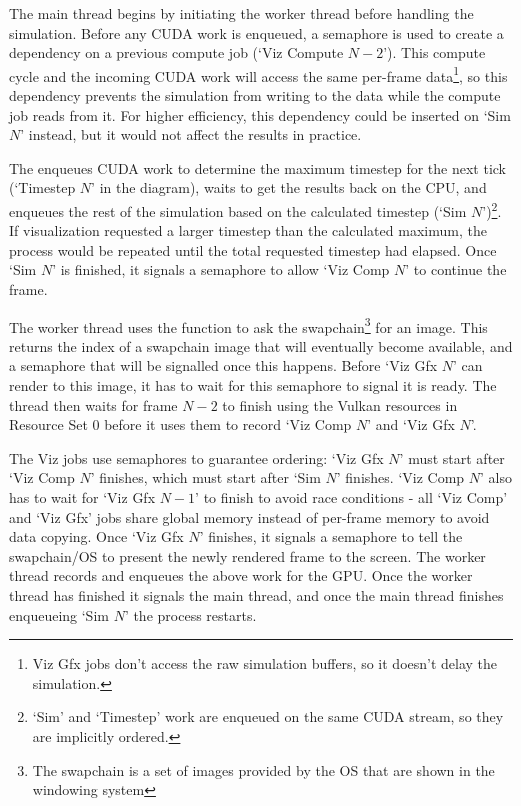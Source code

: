 The main thread begins by initiating the worker thread before handling the simulation.
Before any CUDA work is enqueued, a semaphore is used to create a dependency on a previous compute job (`Viz Compute $N - 2$'). %
This compute cycle and the incoming CUDA work will access the same per-frame data\footnote{Viz Gfx jobs don't access the raw simulation buffers, so it doesn't delay the simulation.}, so this dependency prevents the simulation from writing to the data while the compute job reads from it.
For higher efficiency, this dependency could be inserted on `Sim $N$' instead, but it would not affect the results in practice.

The  enqueues CUDA work to determine the maximum timestep for the next tick (`Timestep $N$' in the diagram), waits to get the results back on the CPU, and enqueues the rest of the simulation based on the calculated timestep (`Sim $N$')\footnote{`Sim' and `Timestep' work are enqueued on the same CUDA stream, so they are implicitly ordered.}.
If visualization requested a larger timestep than the calculated maximum, the process would be repeated until the total requested timestep had elapsed.
Once `Sim $N$' is finished, it signals a semaphore to allow `Viz Comp $N$' to continue the frame. %

The worker thread uses the  function to ask the swapchain\footnote{The swapchain is a set of images provided by the OS that are shown in the windowing system} for an image.
This returns the index of a swapchain image that will eventually become available, and a semaphore that will be signalled once this happens.
Before `Viz Gfx $N$' can render to this image, it has to wait for this semaphore to signal it is ready. %
The thread then waits for frame $N-2$ to finish using the Vulkan resources in Resource Set 0 before it uses them to record `Viz Comp $N$' and `Viz Gfx $N$'. %

The Viz jobs use semaphores to guarantee ordering:
`Viz Gfx $N$' must start after `Viz Comp $N$' finishes, which must start after `Sim $N$' finishes. %
`Viz Comp $N$' also has to wait for `Viz Gfx $N - 1$' to finish to avoid race conditions - all `Viz Comp' and `Viz Gfx' jobs share global memory instead of per-frame memory to avoid data copying. %
Once `Viz Gfx $N$' finishes, it signals a semaphore to tell the swapchain/OS to present the newly rendered frame to the screen.
The worker thread records and enqueues the above work for the GPU.
Once the worker thread has finished it signals the main thread, and once the main thread finishes enqueueing `Sim $N$' the process restarts.

